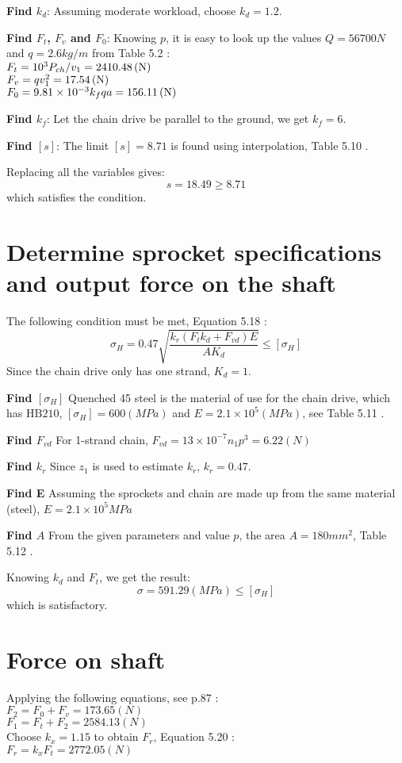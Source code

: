 \textbf{Find $ k_d $}: Assuming moderate workload, choose $ k_d = 1.2 $.

\textbf{Find $ F_t $, $ F_v $ and $ F_0 $}: Knowing $ p $, it is easy to look up the values $ Q=56700 \unit{N}$ and $ q=2.6\unit{kg/m} $ from Table 5.2 \cite{tk1}:\\
$ F_t = {10^3P_{ch}}/{v_1} = 2410.48 \, (\mathrm{N}) $\\
$ F_v=qv_1^2= 17.54 \, (\mathrm{N}) $\\
$ F_0=9.81\times10^{-3}k_fqa = 156.11\, (\mathrm{N})$

\textbf{Find $ k_f $}: Let the chain drive be parallel to the ground, we get $ k_f = 6 $.

\textbf{Find $ [s] $}: The limit $ [s] =8.71$ is found using interpolation, Table 5.10 \cite{tk1}.

Replacing all the variables gives:
\[s=18.49\geq8.71\]
which satisfies the condition.
\section{Determine sprocket specifications and output force on the shaft}
The following condition must be met, Equation 5.18 \cite{tk1}:
\[\sigma_H = 0.47\sqrt{\dfrac{k_r(F_tk_d+F_{vd})E}{AK_d}}\leq[\sigma_H]\]
Since the chain drive only has one strand, $ K_d = 1$.

\textbf{Find $ [\sigma_H] $} Quenched 45 steel is the material of use for the chain drive, which has $ \text{HB}210 $, $ [\sigma_H] = 600 \unit{(MPa)} $ and $ E = 2.1\times10^5 \unit{(MPa)} $, see Table 5.11 \cite{tk1}.

\textbf{Find $ F_{vd} $} For 1-strand chain, $ F_{vd} = 13\times10^{-7}n_1p^3 = 6.22 \unit{(N)}$

\textbf{Find $ k_r $} Since $ z_1 $ is used to estimate $ k_r $, $ k_r= 0.47$.

\textbf{Find E} Assuming the sprockets and chain are made up from the same material (steel), $ E=2.1\times10^5\unit{MPa} $

\textbf{Find $ A $} From the given parameters and value $ p $, the area $ A = 180 \unit{mm^2} $, Table 5.12 \cite{tk1}.

Knowing $ k_d $ and $ F_t $, we get the result:
\[\sigma = 591.29 \unit{(MPa)} \leq [\sigma_H]\]
which is satisfactory.

\section{Force on shaft}
Applying the following equations, see p.87 \cite{tk1}:\\
$ F_2 = F_0 + F_v = 173.65 \unit{(N)}$\\
$ F_1 = F_t + F_2 = 2584.13 \unit{(N)}$\\
Choose $ k_x=1.15 $ to obtain $ F_r $, Equation 5.20 \cite{tk1}:\\
$ F_r = k_xF_t = 2772.05\unit{(N)} $

